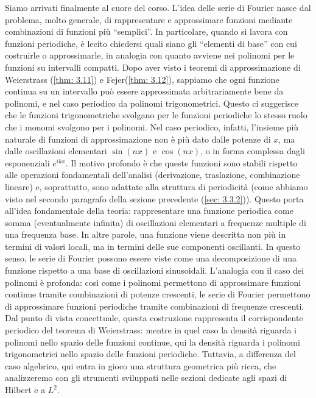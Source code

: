 \documentclass[a4paper,12pt]{report}
\begin{document}
Siamo arrivati finalmente al cuore del corso. L’idea delle serie di Fourier nasce dal problema, molto generale, di rappresentare e approssimare funzioni mediante combinazioni di funzioni più “semplici”. In particolare, quando si lavora con funzioni periodiche, è lecito chiedersi quali siano gli “elementi di base” con cui costruirle o approssimarle, in analogia con quanto avviene nei polinomi per le funzioni su intervalli compatti. Dopo aver visto i teoremi di approssimazione di Weierstrass (\ref{thm: 3.11}) e Fejer(\ref{thm: 3.12}), sappiamo che ogni funzione continua su un intervallo può essere approssimata arbitrariamente bene da polinomi, e nel caso periodico da polinomi trigonometrici. Questo ci suggerisce che le funzioni trigonometriche svolgano per le funzioni periodiche lo stesso ruolo che i monomi svolgono per i polinomi. Nel caso periodico, infatti, l’insieme più naturale di funzioni di approssimazione non è più dato dalle potenze di $x$, ma dalle oscillazioni elementari $\sin({nx})$ e $\cos({nx})$, o in forma complessa dagli esponenziali $e^{ikx}$. Il motivo profondo è che queste funzioni sono stabili rispetto alle operazioni fondamentali dell’analisi (derivazione, traslazione, combinazione lineare) e, soprattutto, sono adattate alla struttura di periodicità (come abbiamo visto nel secondo paragrafo della sezione precedente (\ref{sec: 3.3.2})). Questo porta all’idea fondamentale della teoria: rappresentare una funzione periodica come somma (eventualmente infinita) di oscillazioni elementari a frequenze multiple di una frequenza base. In altre parole, una funzione viene descritta non più in termini di valori locali, ma in termini delle sue componenti oscillanti.  In questo senso, le serie di Fourier possono essere viste come una decomposizione di una funzione rispetto a una base di oscillazioni sinusoidali. L’analogia con il caso dei polinomi è profonda: così come i polinomi permettono di approssimare funzioni continue tramite combinazioni di potenze crescenti, le serie di Fourier permettono di approssimare funzioni periodiche tramite combinazioni di frequenze crescenti. Dal punto di vista concettuale, questa costruzione rappresenta il corrispondente periodico del teorema di Weierstrass: mentre in quel caso la densità riguarda i polinomi nello spazio delle funzioni continue, qui la densità riguarda i polinomi trigonometrici nello spazio delle funzioni periodiche. Tuttavia, a differenza del caso algebrico, qui entra in gioco una struttura geometrica più ricca, che analizzeremo con gli strumenti sviluppati nelle sezioni dedicate agli spazi di Hilbert e a $L^2$.
\end{document}
